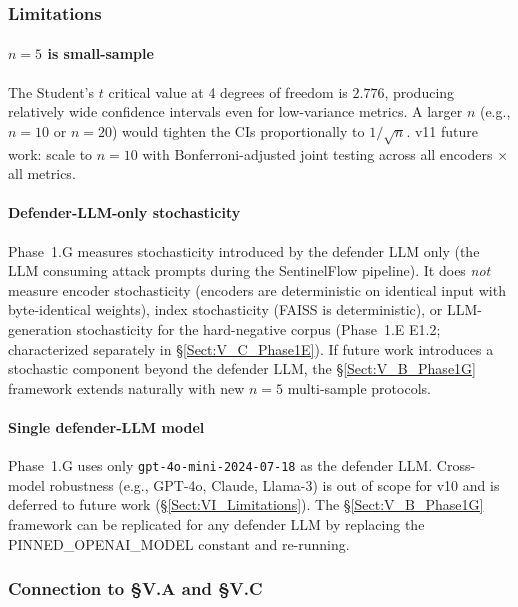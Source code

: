 \documentclass[journal]{IEEEtran}
\begin{document}
\subsubsection{Limitations}
\label{Sect:V_B_8_Limitations}

\paragraph{$n{=}5$ is small-sample}
The Student's $t$ critical value at 4 degrees of freedom is $2.776$, producing relatively wide confidence intervals even for low-variance metrics. A larger $n$ (e.g., $n{=}10$ or $n{=}20$) would tighten the CIs proportionally to $1/\sqrt{n}$. v11 future work: scale to $n{=}10$ with Bonferroni-adjusted joint testing across all encoders $\times$ all metrics.

\paragraph{Defender-LLM-only stochasticity}
Phase~1.G measures stochasticity introduced by the defender LLM only (the LLM consuming attack prompts during the SentinelFlow pipeline). It does \textit{not} measure encoder stochasticity (encoders are deterministic on identical input with byte-identical weights), index stochasticity (FAISS is deterministic), or LLM-generation stochasticity for the hard-negative corpus (Phase~1.E E1.2; characterized separately in \S\ref{Sect:V_C_Phase1E}). If future work introduces a stochastic component beyond the defender LLM, the \S\ref{Sect:V_B_Phase1G} framework extends naturally with new $n{=}5$ multi-sample protocols.

\paragraph{Single defender-LLM model}
Phase~1.G uses only \texttt{gpt-4o-mini-2024-07-18} as the defender LLM. Cross-model robustness (e.g., GPT-4o, Claude, Llama-3) is out of scope for v10 and is deferred to future work (\S\ref{Sect:VI_Limitations}). The \S\ref{Sect:V_B_Phase1G} framework can be replicated for any defender LLM by replacing the PINNED\_OPENAI\_MODEL constant and re-running.

\subsubsection{Connection to \S V.A and \S V.C}
\label{Sect:V_B_9_Connection}
\end{document}
